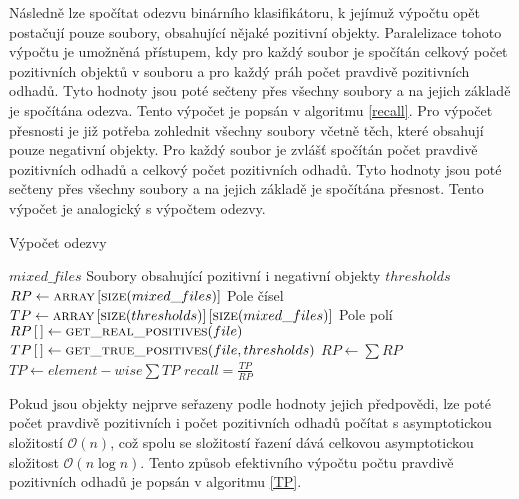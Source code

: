 Následně lze spočítat odezvu binárního klasifikátoru, k jejímuž výpočtu opět postačují pouze soubory, obsahující nějaké pozitivní objekty. Paralelizace tohoto výpočtu je umožněná	přístupem, kdy pro každý soubor je spočítán celkový počet pozitivních objektů v souboru a pro každý práh počet pravdivě pozitivních odhadů. Tyto hodnoty jsou poté sečteny přes všechny soubory a na jejich základě je spočítána odezva. Tento výpočet je popsán v algoritmu \ref{recall}. Pro výpočet přesnosti je již potřeba zohlednit všechny soubory včetně těch, které obsahují pouze negativní objekty. Pro každý soubor je zvlášť spočítán počet pravdivě pozitivních odhadů a celkový počet pozitivních odhadů. Tyto hodnoty jsou poté sečteny přes všechny soubory a na jejich základě je spočítána přesnost. Tento výpočet je analogický s výpočtem odezvy. 

\begin{algorithm}
	\caption{Výpočet odezvy}
	\label{recall}
	\begin{algorithmic}
		\Require $ mixed\_files $ \Comment Soubory obsahující pozitivní i negativní objekty
		\Require $ thresholds $
		\Statex
		\State $ RP \gets \Call{array}{} \left[ \Call{size}{mixed\_files} \right] $ \Comment Pole čísel
		\State $ TP \gets \Call{array}{} \left[ \Call{size}{thresholds} \right] \left[ \Call{size}{mixed\_files} \right] $ \Comment Pole polí
			\State $ RP \left[ \, \right] \gets \Call{get\_real\_positives}{file} $
			\State $ TP \left[ \, \right] \gets \Call{get\_true\_positives}{file, thresholds} $
		\EndFor
		\State $ RP \gets \sum RP $
		\State $ TP \gets element-wise \sum TP $
		\State $ recall = \frac{TP}{RP} $
	\end{algorithmic}
\end{algorithm}

Pokud jsou objekty nejprve seřazeny podle hodnoty jejich předpovědi, lze poté počet pravdivě pozitivních i počet pozitivních odhadů počítat s asymptotickou složitostí \( \mathcal O \left( n \right) \), což spolu se složitostí řazení dává celkovou asymptotickou složitost \( \mathcal O \left( n \log n \right) \). Tento způsob efektivního výpočtu počtu pravdivě pozitivních odhadů je popsán v algoritmu \ref{TP}.


